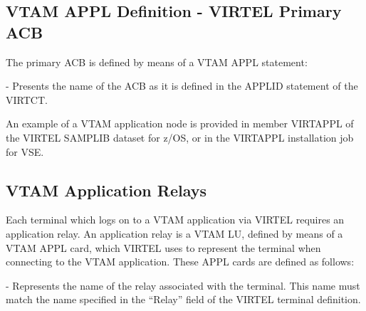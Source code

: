 \documentclass[letterpaper,10pt,english]{sphinxmanual}
\begin{document}

\subsection{VTAM APPL Definition - VIRTEL Primary ACB}
\label{\detokenize{Installation_Guide:index-22}}\label{\detokenize{Installation_Guide:vtam-appl-definition-virtel-primary-acb}}
The primary ACB is defined by means of a VTAM APPL statement:

\begin{sphinxVerbatim}[commandchars=\\\{\}]
  
\end{sphinxVerbatim}

 - Presents the name of the ACB as it is defined in the APPLID statement of the VIRTCT.

An example of a VTAM application node is provided in member VIRTAPPL of the VIRTEL SAMPLIB dataset for z/OS, or in the VIRTAPPL installation job for VSE.


\subsection{VTAM Application Relays}
\label{\detokenize{Installation_Guide:index-23}}\label{\detokenize{Installation_Guide:vtam-application-relays}}
Each terminal which logs on to a VTAM application via VIRTEL requires an application relay. An application relay is a VTAM LU, defined by means of a VTAM APPL card, which VIRTEL uses to represent the terminal when connecting to the VTAM application. These APPL cards are defined as follows:

\begin{sphinxVerbatim}[commandchars=\\\{\}]
  
\end{sphinxVerbatim}

 - Represents the name of the relay associated with the terminal. This name must match the name specified in the “Relay” field of the VIRTEL terminal definition.
\end{document}

